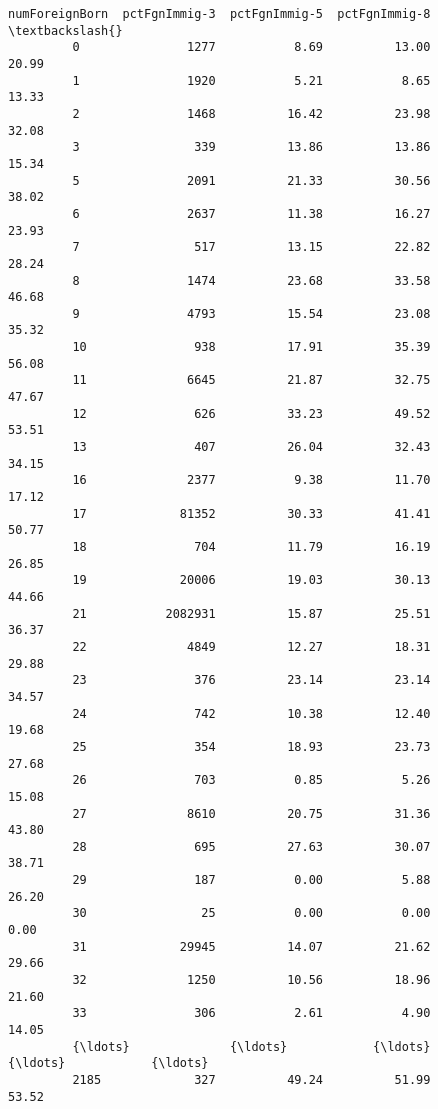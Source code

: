 \documentclass[11pt]{llncs}
\begin{document}
\begin{Verbatim}[commandchars=\\\{\}]
               numForeignBorn  pctFgnImmig-3  pctFgnImmig-5  pctFgnImmig-8  \textbackslash{}
         0               1277           8.69          13.00          20.99   
         1               1920           5.21           8.65          13.33   
         2               1468          16.42          23.98          32.08   
         3                339          13.86          13.86          15.34   
         5               2091          21.33          30.56          38.02   
         6               2637          11.38          16.27          23.93   
         7                517          13.15          22.82          28.24   
         8               1474          23.68          33.58          46.68   
         9               4793          15.54          23.08          35.32   
         10               938          17.91          35.39          56.08   
         11              6645          21.87          32.75          47.67   
         12               626          33.23          49.52          53.51   
         13               407          26.04          32.43          34.15   
         16              2377           9.38          11.70          17.12   
         17             81352          30.33          41.41          50.77   
         18               704          11.79          16.19          26.85   
         19             20006          19.03          30.13          44.66   
         21           2082931          15.87          25.51          36.37   
         22              4849          12.27          18.31          29.88   
         23               376          23.14          23.14          34.57   
         24               742          10.38          12.40          19.68   
         25               354          18.93          23.73          27.68   
         26               703           0.85           5.26          15.08   
         27              8610          20.75          31.36          43.80   
         28               695          27.63          30.07          38.71   
         29               187           0.00           5.88          26.20   
         30                25           0.00           0.00           0.00   
         31             29945          14.07          21.62          29.66   
         32              1250          10.56          18.96          21.60   
         33               306           2.61           4.90          14.05   
         {\ldots}              {\ldots}            {\ldots}            {\ldots}            {\ldots}   
         2185             327          49.24          51.99          53.52   

\end{Verbatim}
\end{document}

